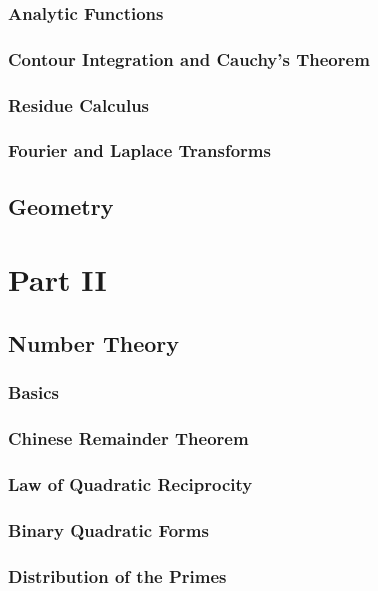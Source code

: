 \documentclass[12pt]{book}
\theoremstyle{definition}
\theoremstyle{remark}
\begin{document}
		\section{Analytic Functions}
		
		\section{Contour Integration and Cauchy's Theorem}
		
		\section{Residue Calculus}
		
		\section{Fourier and Laplace Transforms}
	
	\chapter{Geometry}
		
	
	\part{Part II}
	\chapter{Number Theory}
		\section{Basics}
		
		\section{Chinese Remainder Theorem}
		
		\section{Law of Quadratic Reciprocity}
		
		\section{Binary Quadratic Forms}
		
		\section{Distribution of the Primes}
		
\end{document}
